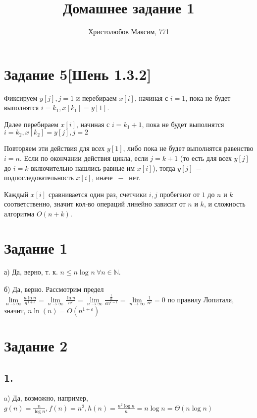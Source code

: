 \documentclass[a4paper,12pt]{article}
\author{Христолюбов Максим, 771}
\title{Домашнее задание 1}
\date{ }
\begin{document}

\maketitle

\section*{Задание 5[Шень 1.3.2]}  
\hspace{0.5cm}
Фиксируем $y[j], j=1$ и перебираем $x[i]$, начиная с $i=1$, пока не будет выполнятся $i=k_{1}, x[k_{1}]=y[1]$.

Далее перебираем $x[i]$, начиная с $i=k_{1}+1$, пока не будет выполнятся $i=k_{2}, x[k_{2}]=y[j], j=2$

Повторяем эти действия для всех $y[1]$, либо пока не будет выполнятся равенство $i=n$.
Если по окончании действия цикла, если $j=k+1$ (то есть для всех $y[j]$ до $i=k$ включительно нашлись равные им $x[i]$), тогда $y[j]~-~$подпоследовательность $x[i]$, иначе $~-~$ нет.

Каждый $x[i]$ сравнивается один раз, счетчики $i,j$ пробегают от $1$ до $n$ и $k$ соответственно, значит кол-во операций линейно зависит от $n$ и $k$, и сложность алгоритма $O(n+k)$.	

\section*{Задание 1}
\hspace{0.5cm}
а) Да, верно, т. к. $n \leq n\log_{}n\ \forall n\in \mathds{N}$.

б) Да, верно. Рассмотрим предел $\lim\limits_{n\to\infty}\frac{n\ln{n}}{n^{1+\varepsilon}}=\lim\limits_{n\to\infty}\frac{\ln{n}}{n^{\varepsilon}}=\lim\limits_{n\to\infty}\frac{\frac{1}{n}}{\varepsilon n^{\varepsilon-1}}=\lim\limits_{n\to\infty}\frac{1}{n^{\varepsilon}}=0$ по правилу Лопиталя, значит, $n\ln(n)=O\left( n^{1+\varepsilon}\right) $

\section*{Задание 2}
\subsection*{1.}
\hspace{0.5cm}
a) Да, возможно, например, $g(n)=\frac{n}{\log{n}}, f(n)=n^{2}, h(n)=\frac{n^{2}\log{n}}{n}=n\log{n}=\Theta(n\log{n})$
\end{document}
